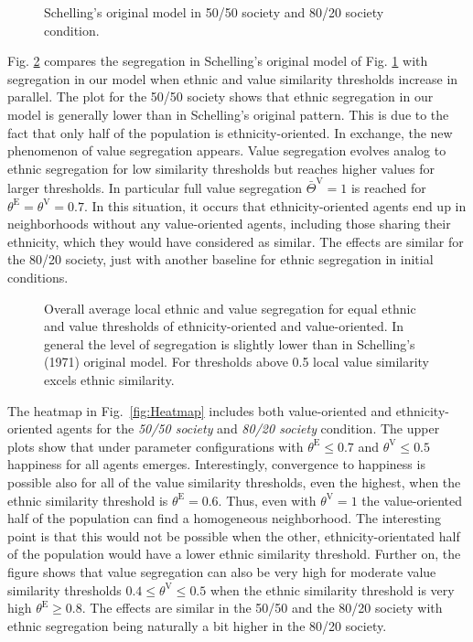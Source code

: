 \documentclass{ws-acs}
\begin{document}
\begin{figure}[th]
\centerline{}
\vspace*{8pt}
\caption{Schelling's original model in 50/50 society and 80/20 society condition.}
\label{fig:OrigSchelling} 
\end{figure}

Fig. \ref{fig:OverallSegregation} compares the segregation in Schelling's original model of Fig. \ref{fig:OrigSchelling} with segregation in our model when ethnic and value similarity thresholds increase in parallel. The plot for the 50/50 society shows that ethnic segregation in our model is generally lower than in Schelling's original pattern. This is due to the fact that only half of the population is ethnicity-oriented. In exchange, the new phenomenon of value segregation appears. Value segregation evolves analog to ethnic segregation for low similarity thresholds but reaches higher values for larger thresholds. In particular full value segregation $\bar\Theta^\text{V} = 1$ is reached for $\theta^\text{E} = \theta^\text{V}=0.7$. In this situation, it occurs that ethnicity-oriented agents end up in neighborhoods without any value-oriented agents, including those sharing their ethnicity, which they would have considered as similar. The effects are similar for the 80/20 society, just with another baseline for ethnic segregation in initial conditions.

\begin{figure}[th]
\centerline{}
\vspace*{8pt}
\caption{Overall average local ethnic and value segregation for equal ethnic and value thresholds of ethnicity-oriented and value-oriented. In general the level of segregation is slightly lower than in Schelling's (1971)  original model. For thresholds above 0.5 local value similarity excels ethnic similarity.} 
\label{fig:OverallSegregation}
\end{figure}

The heatmap in Fig.~\ref{fig:Heatmap} includes both value-oriented and ethnicity-oriented agents for the {\it 50/50 society} and {\it 80/20 society} condition. The upper plots show that under parameter configurations with $\theta^\text{E} \leq 0.7$ and $\theta^\text{V} \leq 0.5$ happiness for all agents emerges. Interestingly, convergence to happiness is possible also for all of the value similarity thresholds, even the highest, when the ethnic similarity threshold is $\theta^\text{E} = 0.6$. Thus, even with  $\theta^\text{V} = 1$ the value-oriented half of the population can find a homogeneous neighborhood. The interesting point is that this would not be possible when the other, ethnicity-orientated half of the population would have a lower ethnic similarity threshold. Further on, the figure shows that value segregation can also be very high for moderate value similarity thresholds $0.4 \leq \theta^\text{V} \leq 0.5$ when the ethnic similarity threshold is very high $\theta^\text{E} \geq 0.8$. The effects are similar in the 50/50 and the 80/20 society with ethnic segregation being naturally a bit higher in the 80/20 society. 
\end{document}
